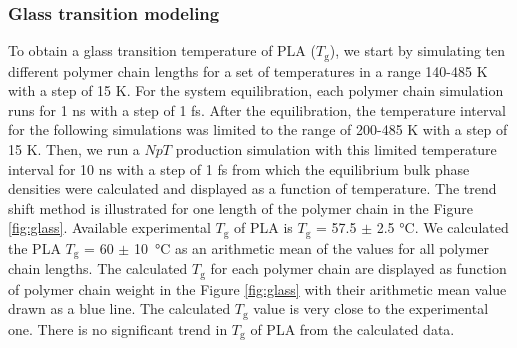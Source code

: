 \subsubsection{Glass transition modeling}
To obtain a glass transition temperature of PLA ($T_\mathrm{g}$), we start by simulating ten different polymer chain lengths for a set of temperatures in a range 140-485 K with a step of 15 K. For the system equilibration, each polymer chain simulation runs for 1 ns with a step of 1 fs. After the equilibration, the temperature interval for the following simulations was limited to the range of 200-485 K with a step of 15 K. Then, we run a $NpT$ production simulation with this limited temperature interval for 10 ns with a step of 1 fs from which the equilibrium bulk phase densities were calculated and displayed as a function of temperature. The trend shift method is illustrated for one length of the polymer chain in the Figure \ref{fig:glass}. Available experimental $T_\mathrm{g}$ of PLA is $T_\mathrm{g}$ = 57.5 $\pm$ 2.5 °C. We calculated the PLA $T_\mathrm{g}$ = 60 $\pm$ 10~°C as an arithmetic mean of the values for all polymer chain lengths. The calculated $T_\mathrm{g}$ for each polymer chain are displayed as function of polymer chain weight in the Figure \ref{fig:glass} with their arithmetic mean value drawn as a blue line. The calculated $T_\mathrm{g}$ value is very close to the experimental one. There is no significant trend in $T_\mathrm{g}$ of PLA from the calculated data. 

